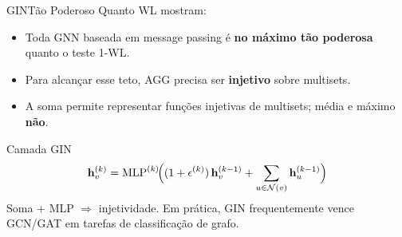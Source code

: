 \documentclass[aspectratio=169,xcolor=dvipsnames]{beamer}
\begin{document}
  \begin{frame}{GIN}{Tão Poderoso Quanto WL}
     mostram:

    \vspace{0.3em}
    \begin{itemize}
      \item Toda GNN baseada em message passing é \textbf{no máximo tão poderosa}
            quanto o teste 1-WL.
      \item Para alcançar esse teto, AGG precisa ser \textbf{injetivo} sobre
            multisets.
      \item A soma permite representar funções injetivas de multisets; média e máximo \textbf{não}.
    \end{itemize}

    \vspace{0.5em}
    \begin{block}{Camada GIN}
      \[
        \mathbf{h}^{(k)}_v = \mathrm{MLP}^{(k)}\!\Bigl(
          (1 + \epsilon^{(k)})\, \mathbf{h}^{(k-1)}_v +
          \sum_{u \in \mathcal{N}(v)} \mathbf{h}^{(k-1)}_u
        \Bigr)
      \]
      Soma + MLP $\Rightarrow$ injetividade. Em prática, GIN frequentemente
      vence GCN/GAT em tarefas de classificação de grafo.
    \end{block}
  \end{frame}
\end{document}
